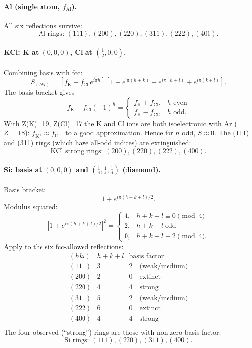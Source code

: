 \documentclass[11pt]{article}
\begin{document}
\paragraph{Al (single atom, $f_{\mathrm{Al}}$).} All six reflections survive:
\[
\boxed{\;\text{Al rings: }(111),(200),(220),(311),(222),(400).\;}
\]

\paragraph{KCl: K at $(0,0,0)$, Cl at $(\tfrac12,0,0)$.} Combining basis with fcc:
\[
S_{(hkl)} = \!\left[f_{\mathrm K} + f_{\mathrm{Cl}}\,e^{i\pi h}\right]\!\left[1 + e^{i\pi(h+k)} + e^{i\pi(h+l)} + e^{i\pi(k+l)}\right].
\]
The basis bracket gives
\[
f_{\mathrm K}+f_{\mathrm{Cl}}(-1)^{h} = \begin{cases} f_{\mathrm K}+f_{\mathrm{Cl}}, & h\text{ even} \\ f_{\mathrm K}-f_{\mathrm{Cl}}, & h\text{ odd}.\end{cases}
\]
With Z(K)=19, Z(Cl)=17 the K and Cl ions are both isoelectronic with Ar ($Z=18$): $f_{\mathrm K^{+}}\approx f_{\mathrm{Cl}^{-}}$ to a good approximation. Hence for $h$ odd, $S\approx 0$. The (111) and (311) rings (which have all-odd indices) are extinguished:
\[
\boxed{\;\text{KCl strong rings: }(200),(220),(222),(400).\;}
\]

\paragraph{Si: basis at $(0,0,0)$ and $(\tfrac14,\tfrac14,\tfrac14)$ (diamond).} Basis bracket:
\[
1 + e^{i\pi(h+k+l)/2}.
\]
Modulus squared:
\[
|1+e^{i\pi(h+k+l)/2}|^{2} = \begin{cases} 4, & h+k+l\equiv 0\pmod 4 \\ 2, & h+k+l\;\text{odd} \\ 0, & h+k+l\equiv 2\pmod 4.\end{cases}
\]
Apply to the six fcc-allowed reflections:
\[
\begin{array}{c|c|c}
(hkl) & h+k+l & \text{basis factor}\\\hline
(111) & 3 & 2\quad\text{(weak/medium)}\\
(200) & 2 & 0\quad\text{extinct}\\
(220) & 4 & 4\quad\text{strong}\\
(311) & 5 & 2\quad\text{(weak/medium)}\\
(222) & 6 & 0\quad\text{extinct}\\
(400) & 4 & 4\quad\text{strong}\\
\end{array}
\]
The four observed (``strong'') rings are those with non-zero basis factor:
\[
\boxed{\;\text{Si rings: }(111),(220),(311),(400).\;}
\]
\end{document}
